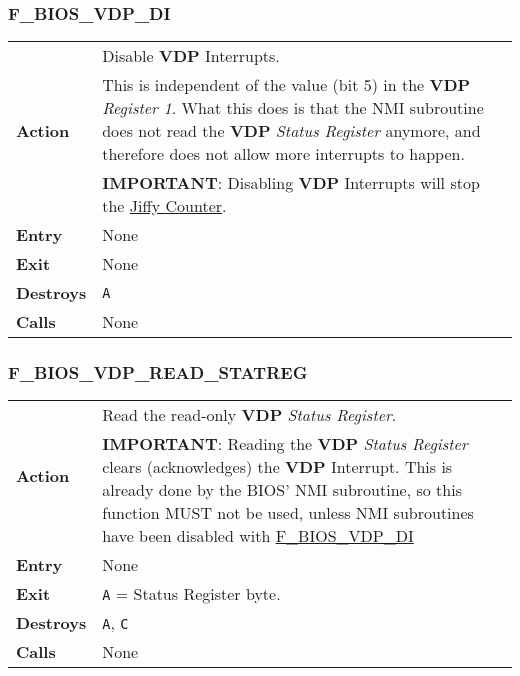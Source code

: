         \subsubsection{F\_BIOS\_VDP\_DI}
        \label{func:fbiosvdpdi}
        \begin{tabular}{l p{9cm}}
            \hline\multirow[t]{3}{4em}{\textbf{Action}}& Disable \textbf{VDP}
            Interrupts.\\
            & This is independent of the value (bit 5) in the \textbf{VDP}
            \textit{Register 1}. What this does is that the NMI subroutine does
            not read the \textbf{VDP} \textit{Status Register} anymore, and
            therefore does not allow more interrupts to happen.\\
            & \textbf{IMPORTANT}: Disabling \textbf{VDP} Interrupts will stop
            the \hyperref[subsec:jiffy_counter]{Jiffy Counter}.\\
            \hline\textbf{Entry} & None\\
            \hline\textbf{Exit} & None\\
            \hline\textbf{Destroys} & \texttt{A}\\
            \hline\textbf{Calls} & None\\
            \hline
        \end{tabular}

        \subsubsection{F\_BIOS\_VDP\_READ\_STATREG}
        \label{func:fbiosvdpreadstatreg}
        \begin{tabular}{l p{9cm}}
            \hline\multirow[t]{2}{4em}{\textbf{Action}}& Read the read-only
            \textbf{VDP} \textit{Status Register}.\\
            & \textbf{IMPORTANT}: Reading the \textbf{VDP} \textit{Status
            Register} clears (acknowledges) the \textbf{VDP} Interrupt. This is
            already done by the BIOS' NMI subroutine, so this function MUST not
            be used, unless NMI subroutines have been disabled with
            \hyperref[func:fbiosvdpdi]{F\_BIOS\_VDP\_DI}\\
            \hline\textbf{Entry} & None\\
            \hline\textbf{Exit} & \texttt{A} = Status Register byte.\\
            \hline\textbf{Destroys} & \texttt{A}, \texttt{C}\\
            \hline\textbf{Calls} & None\\
            \hline
        \end{tabular}

